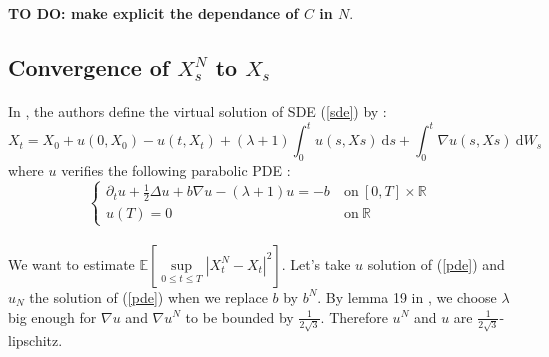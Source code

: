 \documentclass{article}[12pt]
\newtheorem{theo}{Theorem}[section]
\newcommand{\norme}[1]{\left\Vert #1\right\Vert}
\newcommand{\R}{\mathbb{R}}
\newcommand{\E}{\mathbb{E}}
\newcommand{\di}{\mathrm{d}}
\begin{document}
    

    \textbf{TO DO: make explicit the dependance of $C$ in $N$}.
    
    \subsection{Convergence of $X_s^{N}$ to $X_s$}
        \paragraph{}
        In \cite{Fla-Iss-Rus-2017}, the authors define the virtual solution of SDE (\ref{sde}) by :
        \begin{equation}
        X_t = X_0 + u(0,X_0) - u(t,X_t) + (\lambda+1)\int_0^t u(s,Xs)\ \di s +\int_0^t \nabla u(s,Xs)\ \di W_s
        \end{equation}
        where $u$ verifies the following parabolic PDE :
        \begin{equation}\label{pde}
        \begin{cases}
        \partial_t u + \frac{1}{2}\Delta u + b\nabla u - (\lambda+1)u = -b\ &\mathrm{on}\ [0,T]\times\R\\
        u(T) = 0\ &\mathrm{on}\ \R
        \end{cases}
        \end{equation}
        
        \paragraph{}
        We want to estimate $\E\left[\underset{0\leq t\leq T}{\sup}\left|X^{N}_t-X_t\right|^2\right]$. Let's take $u$ solution of (\ref{pde}) and $u_N$ the solution of (\ref{pde}) when we replace $b$ by $b^N$. By lemma 19 in \cite{Fla-Iss-Rus-2017}, we choose $\lambda$ big enough for $\nabla u$ and $\nabla u^N$ to be bounded by $\frac{1}{2\sqrt{3}}$. Therefore $u^N$ and $u$ are $\frac{1}{2\sqrt{3}}$-lipschitz.
        
\end{document}

